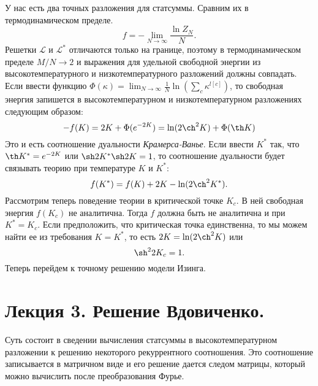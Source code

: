 \documentclass[a4paper,12pt]{article}
\theoremstyle{definition}
\theoremstyle{definition}
\theoremstyle{definition}
\begin{document}
У нас есть два точных разложения для статсуммы. Сравним их в термодинамическом пределе.
\begin{equation}
  \label{eq:109}
  f=-\lim_{N\to \infty}\frac{\ln Z_N}{N}.
\end{equation}
Решетки $\mathcal{L}$ и $\mathcal{L}^*$ отличаются только на границе, поэтому в термодинамическом пределе $M/N\to 2$ и выражения для удельной свободной энергии из высокотемпературного и низкотемпературного разложений должны совпадать. Если ввести функцию $\Phi(\kappa)=\lim_{N\to \infty}\frac{1}{N} \ln \left(\sum_c \kappa^{l[c]}\right)$, то свободная энергия запишется в высокотемпературном и низкотемпературном разложениях следующим образом:
\begin{equation}
  \label{eq:110}
  -f(K)=2K+\Phi(e^{-2K})=\ln(2\ch^2 K)+\Phi(\th K)
\end{equation}
Это и есть соотношение дуальности {\it Крамерса-Ванье}. Если ввести $K^*$ так, что $\th K^*=e^{-2K}$ или $\sh 2K^* \sh 2K=1$, то соотношение дуальности будет связывать теорию при температуре $K$ и $K^*$:
\begin{equation}
  \label{eq:111}
  f(K^*)=f(K)+2K-\ln(2\ch^2 K^*).
\end{equation}
Рассмотрим теперь поведение теории в критической точке $K_c$. В ней свободная энергия $f(K_c)$ не аналитична. Тогда $f$ должна быть не аналитична и при $K^*=K_c$. Если предположить, что критическая точка единственна, то мы можем найти ее из требования $K=K^*$, то есть $2K=\ln(2\ch^2 K)$ или
\begin{equation}
  \label{eq:112}
  \sh^2 2K_c=1.
\end{equation}
Теперь перейдем к точному решению модели Изинга.
\section{Лекция 3. Решение Вдовиченко.}
\label{sec:lecture-6}
Суть состоит в сведении вычисления статсуммы в высокотемпературном разложении к решению некоторого рекуррентного соотношения. Это соотношение записывается в матричном виде и его решение дается следом матрицы, который можно вычислить после преобразования Фурье.
\end{document}
